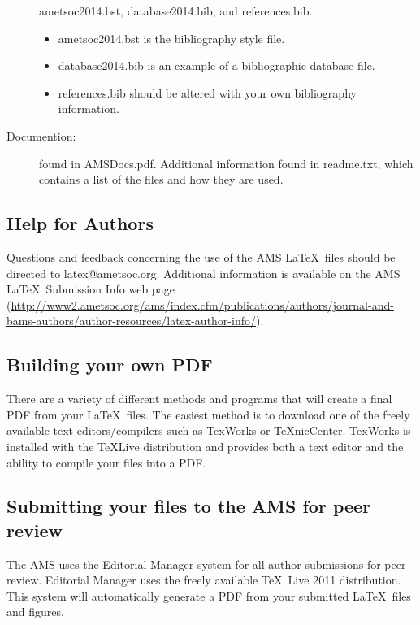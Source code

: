 \documentclass{ametsoc}
\begin{document}
\begin{description}
ametsoc2014.bst, database2014.bib, and references.bib.  

\begin{itemize}
\item
ametsoc2014.bst is the bibliography style file. 

\item
database2014.bib is an example of a bibliographic database file.

\item
references.bib should be altered with your own bibliography information.  
\end{itemize}



\item[Documention:] found in AMSDocs.pdf. Additional information
found in
readme.txt, which contains a list of the files and how they are used.

\end{description}

\subsection{Help for Authors}
Questions and feedback concerning the use of the AMS \LaTeX\ files should be
directed to latex@ametsoc.org. Additional information is available on the AMS
\LaTeX\ Submission Info web page (\url{http://www2.ametsoc.org/ams/index.cfm/publications/authors/journal-and-bams-authors/author-resources/latex-author-info/}).



\appendix[C]

\subsection{Building your own PDF}
There are a variety of different methods and programs that will create a
final PDF from your \LaTeX\ files. The easiest method is to download one of
the freely available text editors/compilers such as TexWorks or TeXnicCenter.
TexWorks is installed with the TeXLive distribution and provides both a text
editor and the ability to compile your files into a PDF.

\subsection{Submitting your files to the AMS for peer review}
The AMS uses the Editorial Manager system for all author submissions for
peer review. Editorial Manager uses the freely available \TeX\ Live 2011
distribution. This system will automatically generate a PDF from your
submitted \LaTeX\ files and figures.  
\end{document}
